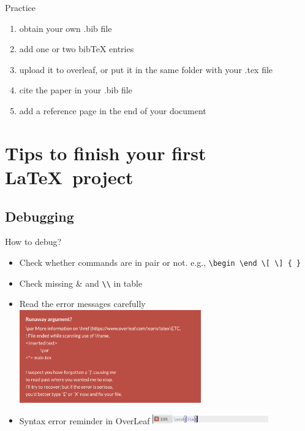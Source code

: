 \documentclass [xcolor=svgnames, t] {beamer}
\begin{document}
\begin{frame}{Practice}
    \begin{enumerate}
        \item obtain your own .bib file
        \item add one or two bibTeX entries
        \item upload it to overleaf, or put it in the same folder with your .tex file
        \item cite the paper in your .bib file
        \item add a reference page in the end of your document
    \end{enumerate}
\end{frame}

\section{Tips to finish your first \LaTeX\ project}
\subsection{Debugging}
\begin{frame}[fragile]{How to debug?}
    \begin{itemize}
        \item Check whether commands are in pair or not. e.g., \verb|\begin \end \[ \] { }|
        \item Check missing \& and \verb|\\| in table
        \item Read the error messages carefully
        \includegraphics[height = 40mm]{figures/ErrorMessages.png}
        \item Syntax error reminder in OverLeaf
        \includegraphics[width = 50mm]{figures/ErrorIndicator.png}
    \end{itemize}
\end{frame}
\end{document}
